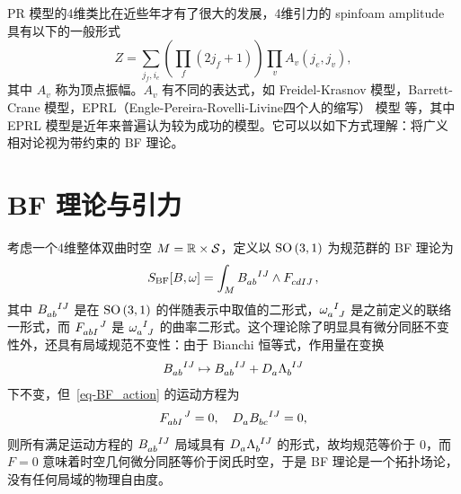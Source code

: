 		PR 模型的4维类比在近些年才有了很大的发展，4维引力的 spinfoam amplitude 具有以下的一般形式
		\begin{equation}
			Z = \sum_{j_f,i_e} \left( \prod_f \left( 2j_f + 1 \right) \right) \prod_{v} A_v(j_e,j_v),
		\end{equation}
		其中 $A_v$ 称为顶点振幅。$A_v$ 有不同的表达式，如 Freidel-Krasnov 模型\cite{Freidel1999,Freidel:2007py}，Barrett-Crane 模型\cite{Barrett1998}，EPRL（Engle-Pereira-Rovelli-Livine四个人的缩写） 模型\cite{EPRL2008} 等，其中 EPRL 模型是近年来普遍认为较为成功的模型。它可以以如下方式理解：将广义相对论视为带约束的 BF 理论。

	\section{BF 理论与引力}

			考虑一个4维整体双曲时空 $M = \mathbb{R} \times \mathcal{S}$，定义以 $\mathrm{SO}\left(3,1\right)$ 为规范群的 BF 理论为
			\begin{equation}
				S_{\mathrm{BF}}[B,\omega] = \int_M \tensor{B}{_a_b^I^J} \wedge \tensor{F}{_c_d_I_J},\label{eq-BF_action}
			\end{equation}
			其中 $\tensor{B}{_a_b^I^J}$ 是在 $\mathrm{SO}\left(3,1\right)$ 的伴随表示中取值的二形式，$\tensor{\omega}{_a^I_J}$ 是之前定义的联络一形式，而 $\tensor{F}{_a_b_I^J}$ 是 $\tensor{\omega}{_a^I_J}$ 的曲率二形式。这个理论除了明显具有微分同胚不变性外，还具有局域规范不变性：由于 Bianchi 恒等式，作用量在变换
			\begin{equation}
				\tensor{B}{_a_b^I^J} \mapsto \tensor{B}{_a_b^I^J} + \tensor{D}{_a} \tensor{\Lambda}{_b^I^J}\label{eq-BF_gauge}
			\end{equation}
			下不变，但~\eqref{eq-BF_action} 的运动方程为
			\begin{equation}
				\tensor{F}{_a_b_I^J}=0 \qc \tensor{D}{_a} \tensor{B}{_b_c^I^J} =0,
			\end{equation}
			则所有满足运动方程的 $\tensor{B}{_a_b^I^J}$ 局域具有 $\tensor{D}{_a} \tensor{\Lambda}{_b^I^J}$ 的形式，故均规范等价于 $0$，而 $F=0$ 意味着时空几何微分同胚等价于闵氏时空，于是 BF 理论是一个拓扑场论，没有任何局域的物理自由度。


